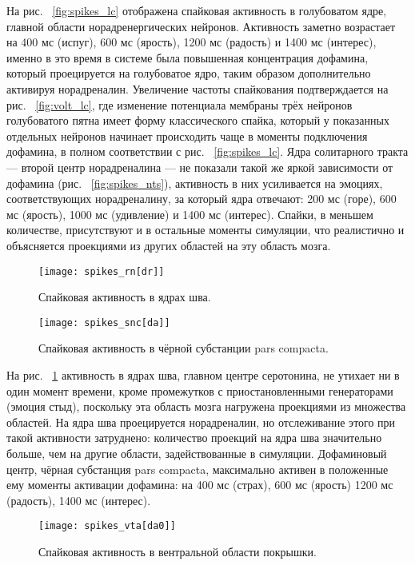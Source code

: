 На рис.  ~\ref{fig:spikes_lc} отображена спайковая активность в голубоватом ядре, главной области норадренергических нейронов. Активность заметно возрастает на 400 мс (испуг), 600 мс (ярость), 1200 мс (радость) и 1400 мс (интерес), именно в это время в системе была повышенная концентрация дофамина, который проецируется на голубоватое ядро, таким образом дополнительно активируя норадреналин. Увеличение частоты спайкования подтверждается на рис. ~\ref{fig:volt_lc}, где изменение потенциала мембраны трёх нейронов голубоватого пятна имеет форму классического спайка, который у показанных отдельных нейронов начинает происходить чаще в моменты подключения дофамина, в полном соответствии с рис.  ~\ref{fig:spikes_lc}. Ядра солитарного тракта --- второй центр норадреналина --- не показали такой же яркой зависимости от дофамина (рис. ~\ref{fig:spikes_nts}), активность в них усиливается на эмоциях, соответствующих норадреналину, за который ядра отвечают: 200 мс (горе), 600 мс (ярость), 1000 мс (удивление) и 1400 мс (интерес). Спайки, в меньшем количестве, присутствуют и в остальные моменты симуляции, что реалистично и объясняется проекциями из других областей на эту область мозга.

\begin{figure}
	\centering
	\texttt{[image: spikes\_rn[dr]]}
	\caption{Спайковая активность в ядрах шва.}
	\label{fig:spikes_rn}
\end{figure}

\begin{figure}
	\centering
	\texttt{[image: spikes\_snc[da]]}
	\caption{Спайковая активность в чёрной субстанции pars compacta.}
	\label{fig:spikes_snc}
\end{figure}

На рис. ~\ref{fig:spikes_rn} активность в ядрах шва, главном центре серотонина, не утихает ни в один момент времени, кроме промежутков с приостановленными генераторами (эмоция стыд), поскольку эта область мозга нагружена проекциями из множества областей. На ядра шва проецируется норадреналин, но отслеживание этого при такой активности затруднено: количество проекций на ядра шва значительно больше, чем на другие области, задействованные в симуляции. Дофаминовый центр, чёрная субстанция pars compacta, максимально активен в положенные ему моменты активации дофамина: на 400 мс (страх), 600 мс (ярость) 1200 мс (радость), 1400 мс (интерес).

\begin{figure}
	\centering
	\texttt{[image: spikes\_vta[da0]]}
	\caption{Спайковая активность в вентральной области покрышки.}
	\label{fig:spikes_vta}
\end{figure}

